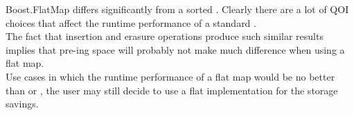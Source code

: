 Boost.FlatMap differs significantly from a sorted .  Clearly
there are a lot of QOI choices that affect the runtime performance of a
standard .\\

The fact that insertion and erasure operations produce such similar results
implies that pre-ing space will probably not make much
difference when using a flat map.\\

Use cases in which the runtime performance of a flat map would be no better
than  or , the user may still decide to use a
flat implementation for the storage savings.
